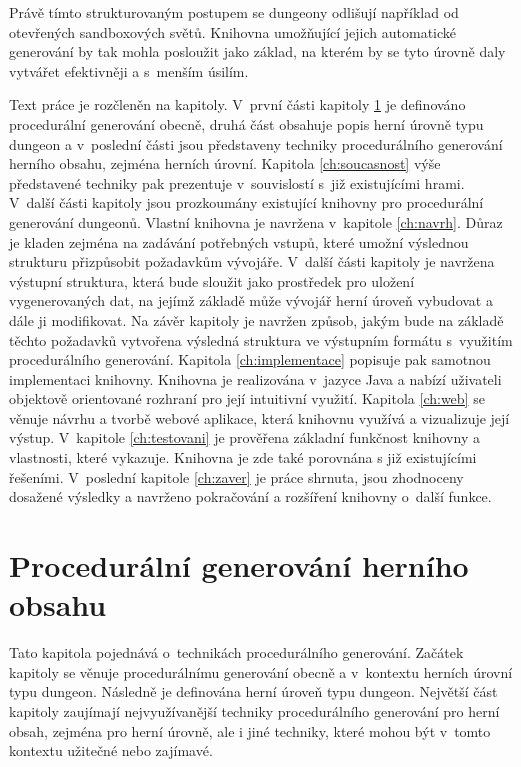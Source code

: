 Právě tímto strukturovaným postupem se dungeony odlišují například od otevřených sandboxových světů.
Knihovna umožňující jejich automatické generování by tak mohla posloužit jako základ, na kterém by se tyto úrovně daly vytvářet efektivněji a s~menším úsilím.
\par
Text práce je rozčleněn na kapitoly.
V~první části kapitoly \ref{ch:procgen} je definováno procedurální generování obecně, druhá část obsahuje popis herní úrovně typu dungeon a v~poslední části jsou představeny techniky procedurálního generování herního obsahu, zejména herních úrovní.
Kapitola \ref{ch:soucasnost} výše představené techniky pak prezentuje v~souvislostí s~již existujícími hrami.
V~další části kapitoly jsou prozkoumány existující knihovny pro procedurální generování dungeonů.
Vlastní knihovna je navržena v~kapitole \ref{ch:navrh}.
Důraz je kladen zejména na zadávání potřebných vstupů, které umožní výslednou strukturu přizpůsobit požadavkům vývojáře.
V~další části kapitoly je navržena výstupní struktura, která bude sloužit jako prostředek pro uložení vygenerovaných dat, na jejímž základě může vývojář herní úroveň vybudovat a dále ji modifikovat.
Na závěr kapitoly je navržen způsob, jakým bude na základě těchto požadavků vytvořena výsledná struktura ve výstupním formátu s~využitím procedurálního generování.
Kapitola \ref{ch:implementace} popisuje pak samotnou implementaci knihovny.
Knihovna je realizována v~jazyce Java a nabízí uživateli objektově orientované rozhraní pro její intuitivní využití.
Kapitola \ref{ch:web} se věnuje návrhu a tvorbě webové aplikace, která knihovnu využívá a vizualizuje její výstup.
V~kapitole \ref{ch:testovani} je prověřena základní funkčnost knihovny a vlastnosti, které vykazuje.
Knihovna je zde také porovnána s již existujícími řešeními.
V~poslední kapitole \ref{ch:zaver} je práce shrnuta, jsou zhodnoceny dosažené výsledky a navrženo pokračování a rozšíření knihovny o~další funkce.


\chapter{Procedurální generování herního obsahu}
\label{ch:procgen} %


Tato kapitola pojednává o~technikách procedurálního generování.
Začátek kapitoly se věnuje procedurálnímu generování obecně a v~kontextu herních úrovní typu dungeon.
Následně je definována herní úroveň typu dungeon.
Největší část kapitoly zaujímají nejvyužívanější techniky procedurálního generování pro herní obsah, zejména pro herní úrovně, ale i jiné techniky, které mohou být v~tomto kontextu užitečné nebo zajímavé.

